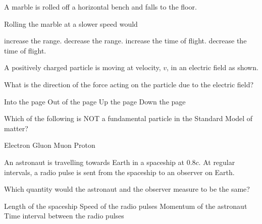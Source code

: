 \documentclass{src/hsc}
\begin{document}
\begin{mcquestions}
    \question\label{mcqfirst} A marble is rolled off a horizontal bench and falls to the floor.
    
     \bigskip

    Rolling the marble at a slower speed would

    \begin{choices}
        \choice increase the range.
        \choice decrease the range.
        \choice increase the time of flight.
        \choice decrease the time of flight.
    \end{choices}

    \question A positively charged particle is moving at velocity, $v$, in an electric field as shown.

    What is the direction of the force acting on the particle due to the electric field?

    \begin{choices}
        \choice Into the page
        \choice Out of the page
        \choice Up the page
        \choice Down the page
    \end{choices}

    \clearpage

    \question Which of the following is NOT a fundamental particle in the Standard Model of matter?

    \begin{choices}
        \choice Electron
        \choice Gluon
        \choice Muon
        \choice Proton
    \end{choices}

    \question\label{mcqlast} An astronaut is travelling towards Earth in a spaceship at $0.8c$. At regular intervals, a radio pulse is sent from the spaceship to an observer on Earth.

    Which quantity would the astronaut and the observer measure to be the same?

    \begin{choices}
        \choice Length of the spaceship
        \choice Speed of the radio pulses
        \choice Momentum of the astronaut
        \choice Time interval between the radio pulses
    \end{choices}
\end{mcquestions}

\fillbooklet

\finishsectionone
\end{document}
